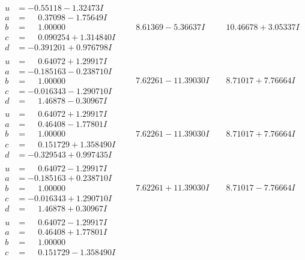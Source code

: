 \documentclass[1p]{elsarticle_modified}
\theoremstyle{definition}
\begin{document}
$$\begin{array}{c|c|c}
\begin{aligned}
u &= -0.55118 - 1.32473 I \\
a &= \phantom{-}0.37098 - 1.75649 I \\
b &= \phantom{-}1.00000\phantom{ +0.000000I} \\
c &= \phantom{-}0.090254 + 1.314840 I \\
d &= -0.391201 + 0.976798 I\end{aligned}
 & \phantom{-}8.61369 - 5.36637 I & \phantom{-}10.46678 + 3.05337 I \\ \hline\begin{aligned}
u &= \phantom{-}0.64072 + 1.29917 I \\
a &= -0.185163 - 0.238710 I \\
b &= \phantom{-}1.00000\phantom{ +0.000000I} \\
c &= -0.016343 - 1.290710 I \\
d &= \phantom{-}1.46878 - 0.30967 I\end{aligned}
 & \phantom{-}7.62261 - 11.39030 I & \phantom{-}8.71017 + 7.76664 I \\ \hline\begin{aligned}
u &= \phantom{-}0.64072 + 1.29917 I \\
a &= \phantom{-}0.46408 - 1.77801 I \\
b &= \phantom{-}1.00000\phantom{ +0.000000I} \\
c &= \phantom{-}0.151729 + 1.358490 I \\
d &= -0.329543 + 0.997435 I\end{aligned}
 & \phantom{-}7.62261 - 11.39030 I & \phantom{-}8.71017 + 7.76664 I \\ \hline\begin{aligned}
u &= \phantom{-}0.64072 - 1.29917 I \\
a &= -0.185163 + 0.238710 I \\
b &= \phantom{-}1.00000\phantom{ +0.000000I} \\
c &= -0.016343 + 1.290710 I \\
d &= \phantom{-}1.46878 + 0.30967 I\end{aligned}
 & \phantom{-}7.62261 + 11.39030 I & \phantom{-}8.71017 - 7.76664 I \\ \hline\begin{aligned}
u &= \phantom{-}0.64072 - 1.29917 I \\
a &= \phantom{-}0.46408 + 1.77801 I \\
b &= \phantom{-}1.00000\phantom{ +0.000000I} \\
c &= \phantom{-}0.151729 - 1.358490 I \\

\end{aligned}
\end{array}$$
\end{document}
